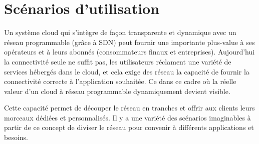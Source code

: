 
\section{Scénarios d'utilisation}

Un système cloud qui s'intègre de façon transparente et dynamique avec un réseau programmable (grâce à SDN) peut fournir une importante plus-value à ses opérateurs et à leurs abonnés (consommateurs finaux et entreprises). Aujourd'hui la connectivité seule ne suffit pas, les utilisateurs réclament une variété de services hébergés dans le cloud, et cela exige des réseau la capacité de fournir la connectivité correcte à l'application souhaitée. Ce dans ce cadre où  la réelle valeur d'un cloud à réseau programmable dynamiquement devient visible.

Cette capacité permet de découper le réseau en tranches et offrir aux clients leurs morceaux dédiées et personnalisés. Il y a une variété des scénarios imaginables  à partir de ce concept de diviser le réseau pour convenir à différents applications et besoins.

